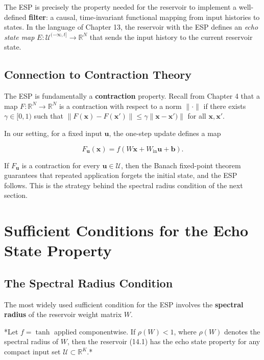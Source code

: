 \begin{remark}
The ESP is precisely the property needed for the reservoir to implement a well-defined \textbf{filter}: a causal, time-invariant functional mapping from input histories to states. In the language of Chapter 13, the reservoir with the ESP defines an \textit{echo state map} $E: \mathcal{U}^{(-\infty, t]} \to \mathbb{R}^N$ that sends the input history to the current reservoir state.
\end{remark}


\subsection{Connection to Contraction Theory}\label{sec:14.2.2}

The ESP is fundamentally a \textbf{contraction} property. Recall from Chapter 4 that a map $F: \mathbb{R}^N \to \mathbb{R}^N$ is a contraction with respect to a norm $\|\cdot\|$ if there exists $\gamma \in [0, 1)$ such that $\|F(\mathbf{x}) - F(\mathbf{x}')\| \leq \gamma \|\mathbf{x} - \mathbf{x}')\|$ for all $\mathbf{x}, \mathbf{x}'$.

In our setting, for a fixed input $\mathbf{u}$, the one-step update defines a map

\[
F_{\mathbf{u}}(\mathbf{x}) = f(W\mathbf{x} + W_{\text{in}}\mathbf{u} + \mathbf{b}).
\]

If $F_{\mathbf{u}}$ is a contraction for every $\mathbf{u} \in \mathcal{U}$, then the Banach fixed-point theorem guarantees that repeated application forgets the initial state, and the ESP follows. This is the strategy behind the spectral radius condition of the next section.


\bigskip


\section{Sufficient Conditions for the Echo State Property}\label{sec:14.3}

\subsection{The Spectral Radius Condition}\label{sec:14.3.1}

The most widely used sufficient condition for the ESP involves the \textbf{spectral radius} of the reservoir weight matrix $W$.

\begin{theorem}\label{thm:14.1}
*Let $f = \tanh$ applied componentwise. If $\rho(W) < 1$, where $\rho(W)$ denotes the spectral radius of $W$, then the reservoir (14.1) has the echo state property for any compact input set $\mathcal{U} \subset \mathbb{R}^K$.*
\end{theorem}


